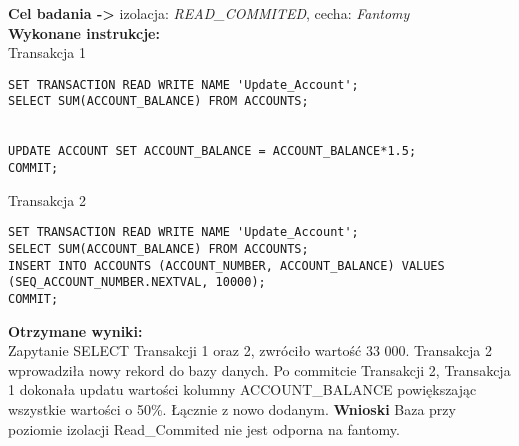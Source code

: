 \documentclass[11pt,oneside, a4paper]{article}
\begin{document}
\textbf{Cel badania ->} izolacja:
\textit{READ\_COMMITED}, cecha:
\textit{Fantomy} \\
\textbf{Wykonane instrukcje: } \\
Transakcja 1
\begin{lstlisting}
SET TRANSACTION READ WRITE NAME 'Update_Account';
SELECT SUM(ACCOUNT_BALANCE) FROM ACCOUNTS;


UPDATE ACCOUNT SET ACCOUNT_BALANCE = ACCOUNT_BALANCE*1.5;
COMMIT;
\end{lstlisting}
Transakcja 2
\begin{lstlisting}
SET TRANSACTION READ WRITE NAME 'Update_Account';
SELECT SUM(ACCOUNT_BALANCE) FROM ACCOUNTS;
INSERT INTO ACCOUNTS (ACCOUNT_NUMBER, ACCOUNT_BALANCE) VALUES (SEQ_ACCOUNT_NUMBER.NEXTVAL, 10000);
COMMIT;
\end{lstlisting}
\textbf{Otrzymane wyniki:} \\
    Zapytanie SELECT Transakcji 1 oraz 2, zwróciło  wartość 33 000. Transakcja 2 wprowadziła nowy rekord do bazy danych. Po commitcie Transakcji 2, Transakcja 1 dokonała updatu wartości kolumny ACCOUNT_BALANCE powiększając wszystkie wartości o 50\%. Łącznie z nowo dodanym.
\textbf{Wnioski } Baza przy poziomie izolacji Read\_Commited nie jest odporna na fantomy.\\
\end{document}
